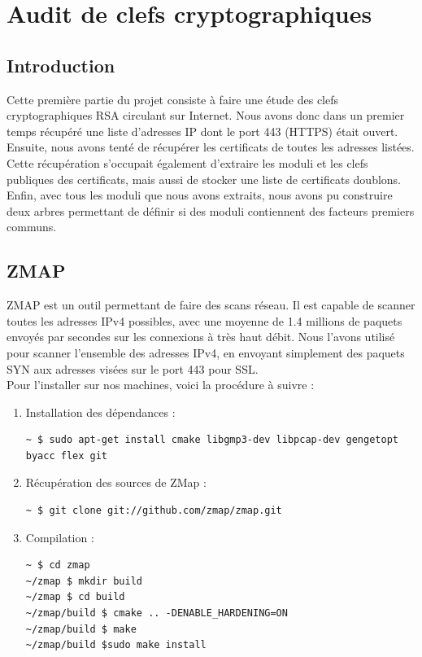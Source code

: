 \chapter{Audit de clefs cryptographiques}

\section{Introduction}
Cette première partie du projet consiste à faire une étude des clefs cryptographiques RSA circulant sur Internet. Nous avons donc dans un premier temps récupéré une liste d'adresses IP dont le port 443 (HTTPS) était ouvert.\\


Ensuite, nous avons tenté de récupérer les certificats de toutes les adresses listées. Cette récupération s'occupait également d'extraire les moduli et les clefs publiques des certificats, mais aussi de stocker une liste de certificats doublons.\\


Enfin, avec tous les moduli que nous avons extraits, nous avons pu construire deux arbres permettant de définir si des moduli contiennent des facteurs premiers communs.

\section{ZMAP}

ZMAP est un outil permettant de faire des scans réseau.  Il est capable de scanner toutes les adresses IPv4 possibles, avec une moyenne de 1.4 millions de paquets envoyés par secondes sur les connexions à très haut débit. Nous l'avons utilisé pour scanner l'ensemble des adresses IPv4, en envoyant simplement des paquets SYN aux adresses visées sur le port 443 pour SSL.\\


Pour l'installer sur nos machines, voici la procédure à suivre :
\begin{enumerate}
\item Installation des dépendances :
\begin{verbatim}
~ $ sudo apt-get install cmake libgmp3-dev libpcap-dev gengetopt byacc flex git
\end{verbatim}
\item Récupération des sources de ZMap :
\begin{verbatim}
~ $ git clone git://github.com/zmap/zmap.git
\end{verbatim}
\item Compilation :
\begin{verbatim}
~ $ cd zmap
~/zmap $ mkdir build
~/zmap $ cd build
~/zmap/build $ cmake .. -DENABLE_HARDENING=ON
~/zmap/build $ make
~/zmap/build $sudo make install
\end{verbatim}
\end{enumerate}


